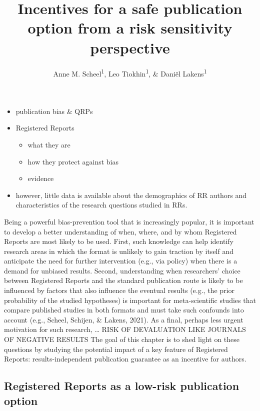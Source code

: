 \documentclass[british,,man,floatsintext]{apa6}
\title{Incentives for a safe publication option from a risk sensitivity perspective}
\author{Anne M. Scheel\textsuperscript{1}, Leo Tiokhin\textsuperscript{1}, \& Daniël Lakens\textsuperscript{1}}
\date{}
\affiliation{\vspace{0.5cm}\textsuperscript{1} Eindhoven University of Technology}
\providecommand{\tightlist}{%
  \setlength{\itemsep}{0pt}\setlength{\parskip}{0pt}}
\begin{document}
\maketitle

\begin{itemize}
\tightlist
\item
  publication bias \& QRPs
\item
  Registered Reports

  \begin{itemize}
  \tightlist
  \item
    what they are
  \item
    how they protect against bias
  \item
    evidence
  \end{itemize}
\item
  however, little data is available about the demographics of RR authors and characteristics of the research questions studied in RRs.
\end{itemize}

Being a powerful bias-prevention tool that is increasingly popular, it is important to develop a better understanding of when, where, and by whom Registered Reports are most likely to be used.
First, such knowledge can help identify research areas in which the format is unlikely to gain traction by itself and anticipate the need for further intervention (e.g., via policy) when there is a demand for unbiased results.
Second, understanding when researchers' choice between Registered Reports and the standard publication route is likely to be influenced by factors that also influence the eventual results (e.g., the prior probability of the studied hypotheses) is important for meta-scientific studies that compare published studies in both formats and must take such confounds into account (e.g., Scheel, Schijen, \& Lakens, 2021).
As a final, perhaps less urgent motivation for such research, \ldots{} RISK OF DEVALUATION LIKE JOURNALS OF NEGATIVE RESULTS
The goal of this chapter is to shed light on these questions by studying the potential impact of a key feature of Registered Reports: results-independent publication guarantee as an incentive for authors.

\hypertarget{registered-reports-as-a-low-risk-publication-option}{%
\subsection{Registered Reports as a low-risk publication option}\label{registered-reports-as-a-low-risk-publication-option}}
\end{document}
